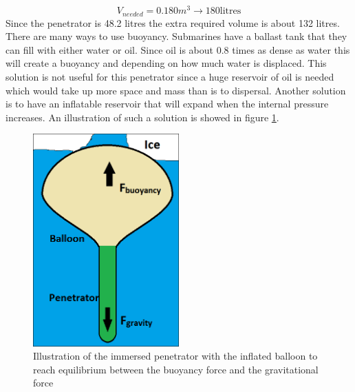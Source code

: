 \begin{equation}
V_{needed} = 0.180 m^3 \rightarrow 180 \text{litres}
\end{equation}
Since the penetrator is 48.2 litres the extra required volume is about 132 litres. There are many ways to use buoyancy. Submarines have a ballast tank that they can fill with either water or oil. Since oil is about 0.8 times as dense as water this will create a buoyancy and depending on how much water is displaced. This solution is not useful for this penetrator since a huge reservoir of oil is needed which would take up more space and mass than is to dispersal. Another solution is to have an inflatable reservoir that will expand when the internal pressure increases. An illustration of such a solution is showed in figure \ref{fig:buoyancy1}.
\begin{figure}[htb]
  \centering
  \includegraphics[width=0.5\textwidth]{figures/Ricardo/Buoyancy1.png}
  \caption{Illustration of the immersed penetrator with the inflated balloon to reach equilibrium between the buoyancy force and the gravitational force}
  \label{fig:buoyancy1}
\end{figure}
